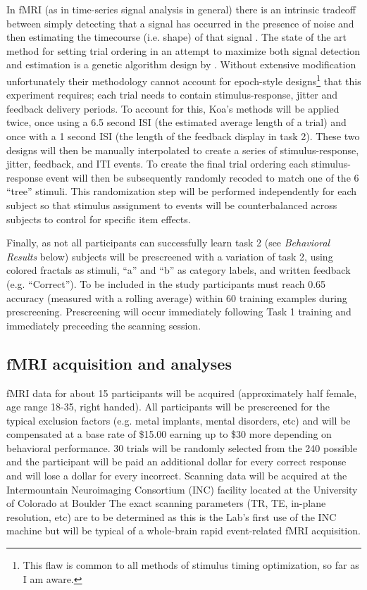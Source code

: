 \documentclass[doc,12pt]{apa}        %
\begin{document}
In fMRI (as in time-series signal analysis in general) there is an intrinsic tradeoff between simply detecting that a signal has occurred in the presence of noise and then estimating the timecourse (i.e. shape) of that signal \cite{Dale:1999p7901,Birn:2002p1777,Liu:2004p2141}.   The state of the art method for setting trial ordering in an attempt to maximize both signal detection and estimation is a genetic algorithm design by .  Without extensive modification unfortunately their methodology cannot account for epoch-style designs\footnote{This flaw is common to all methods of stimulus timing optimization, so far as I am aware.} that this experiment requires; each trial needs to contain stimulus-response, jitter and feedback delivery periods.  To account for this, Koa's methods will be applied twice, once using a 6.5 second ISI (the estimated average length of a trial) and once with a 1 second ISI (the length of the feedback display in task 2).  These two designs will then be manually interpolated to create a series of stimulus-response, jitter, feedback, and ITI events.  To create the final trial ordering each stimulus-response event will then be subsequently randomly recoded to match one of the 6 ``tree'' stimuli.  This randomization step will be performed independently for each subject so that stimulus assignment to events will be counterbalanced across subjects to control for specific item effects.  

Finally, as not all participants can successfully learn task 2 (see \emph{Behavioral Results} below) subjects will be prescreened with a variation of task 2, using colored fractals as stimuli, ``a'' and ``b'' as category labels, and written feedback (e.g. ``Correct'').  To be included in the study participants must reach 0.65 accuracy (measured with a rolling average) within 60 training examples during prescreening.  Prescreening will occur immediately following Task 1 training and immediately preceeding the scanning session.

\subsection{fMRI acquisition and analyses} %
\label{sub:fmri}

fMRI data for about 15 participants will be acquired  (approximately half female, age range 18-35, right handed).   All participants will be prescreened for the typical exclusion factors (e.g. metal implants, mental disorders, etc) and will be compensated at a base rate of \$15.00 earning up to \$30 more depending on behavioral performance. 30 trials will be randomly selected from the 240 possible and the participant will be paid an additional dollar for every correct response and will lose a dollar for every incorrect. Scanning data will be acquired at the Intermountain Neuroimaging Consortium (INC) facility located at the University of Colorado at Boulder The exact scanning parameters (TR, TE, in-plane resolution, etc) are to be determined as this is the Lab's first use of the INC machine but will be typical of a whole-brain rapid event-related fMRI acquisition.
\end{document}
